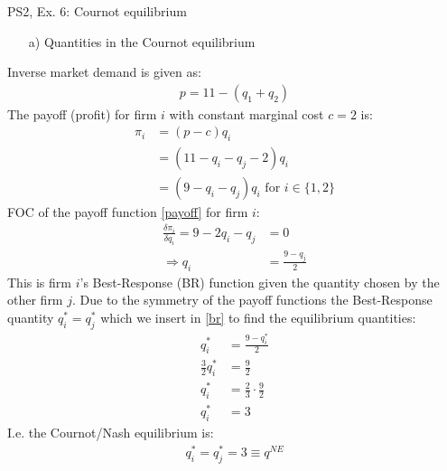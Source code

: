 \begin{frame}{PS2, Ex. 6: Cournot equilibrium}
  \begin{multicols}{2}
    \begin{itemize}
      \item[a)] Quantities in the Cournot equilibrium
    \end{itemize}
    Inverse market demand is given as:
    \begin{align}
      p = 11 - (q_1+q_2) \label{p}
    \end{align}
    The payoff (profit) for firm $i$ with constant marginal cost $c=2$ is:
    \begin{align}
        \pi_i&=(p-c)q_i \nonumber\\
             &=(11-q_i-q_j-2)q_i\nonumber\\
             &=(9-q_i-q_j)q_i\text{ for }i\in\{1,2\}
      \label{payoff}
    \end{align}
    FOC of the payoff function \eqref{payoff} for firm $i$:
    \begin{align}
        \frac{\delta\pi_i}{\delta q_i}=9-2q_i-q_j&=0\nonumber\\
        \Rightarrow q_i &= \frac{9-q_j}{2}
      \label{br}
    \end{align}
    This is firm $i$'s Best-Response (BR) function given the quantity chosen by the other firm $j$.
  \vfill\null \columnbreak
    Due to the symmetry of the payoff functions the Best-Response quantity $q_i^{*}=q_j^{*}$ which we insert in \eqref{br} to find the equilibrium quantities:
    \begin{align}
        q_i^{*} &= \frac{9-q_i^{*}}{2}\nonumber\\
        \frac{3}{2}q_i^{*} &= \frac{9}{2}\nonumber\\
        q_i^{*} &= \frac{2}{3}\cdot\frac{9}{2}\nonumber\\
        q_i^{*} &= 3
        \label{ne}
    \end{align}
    I.e. the Cournot/Nash equilibrium is:
    \begin{align*}
      q_i^{*}=q_j^{*}=3\equiv q^{NE}
    \end{align*}
  \vfill\null
  \end{multicols}
\end{frame}
